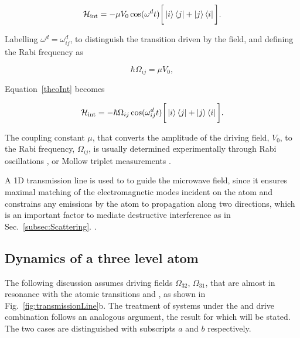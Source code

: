   \begin{equation}
  	\mathcal{H}_{\text{int}} = - \mu V_0\cos(\omega^{d} t) \bigg[\ket{i}\bra{j}+\ket{j}\bra{i}\bigg].
  	\label{theoInt}
  \end{equation}

  \noindent Labelling $ \omega^{d} = \omega^{d}_{ij} $, to distinguish the transition driven by the field, and defining the Rabi frequency as 
  
  \begin{equation}\label{rabiRelation}
  	\hbar\Omega_{ij} = \mu V_0,
  \end{equation}
  
  \noindent Equation~\eqref{theoInt} becomes
  
  \begin{equation}\label{theoIntFinal}
  		\mathcal{H}_{\text{int}} = - \hbar\Omega_{ij}\cos(\omega^{d}_{ij} t) \bigg[\ket{i}\bra{j}+\ket{j}\bra{i}\bigg].
  \end{equation}
 		 	
   \noindent The coupling constant $ \mu $, that converts the amplitude of the driving field, $ V_0 $, to the Rabi frequency, $ \Omega_{ij} $, is usually determined experimentally through Rabi oscillations \cite{rabiOscillationsInJJQubit}, or Mollow triplet measurements \cite{observationofresonancefluorescence,measurementofAutlerTownes}.
   
   A 1D transmission line is used to to guide the microwave field, since it ensures maximal matching of the electromagnetic modes incident on the atom and constrains any emissions by the atom to propagation along two directions, which is an important factor to mediate destructive interference as in Sec.~\ref{subsec:Scattering}. \cite{astafiev_ResonanceSingleAtom}.
    
 \subsection{Dynamics of a three level atom\label{subsec:3LevelAtom}}

  
  The following discussion assumes driving fields $ \Omega_{32} $, $ \Omega_{31} $, that are almost in resonance with the atomic transitions \lra{} and \lra{}, as shown in Fig.~\ref{fig:transmissionLine}b. The treatment of systems under the \lra{} and \lra{} drive combination follows an analogous argument, the result for which will be stated. The two cases are distinguished with subscripts $ a $ and $ b $ respectively.
  
